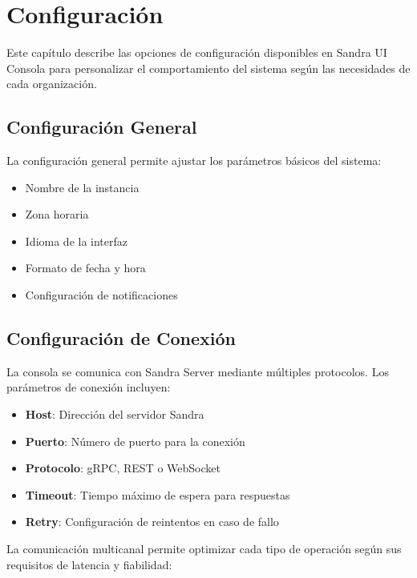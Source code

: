 
\chapter{Configuración}

Este capítulo describe las opciones de configuración disponibles en Sandra UI Consola para personalizar el comportamiento del sistema según las necesidades de cada organización.

\section{Configuración General}

La configuración general permite ajustar los parámetros básicos del sistema:

\begin{itemize}
    \item Nombre de la instancia
    \item Zona horaria
    \item Idioma de la interfaz
    \item Formato de fecha y hora
    \item Configuración de notificaciones
\end{itemize}

\section{Configuración de Conexión}

La consola se comunica con Sandra Server mediante múltiples protocolos. Los parámetros de conexión incluyen:

\begin{itemize}
    \item \textbf{Host}: Dirección del servidor Sandra
    \item \textbf{Puerto}: Número de puerto para la conexión
    \item \textbf{Protocolo}: gRPC, REST o WebSocket
    \item \textbf{Timeout}: Tiempo máximo de espera para respuestas
    \item \textbf{Retry}: Configuración de reintentos en caso de fallo
\end{itemize}

La comunicación multicanal permite optimizar cada tipo de operación según sus requisitos de latencia y fiabilidad:

